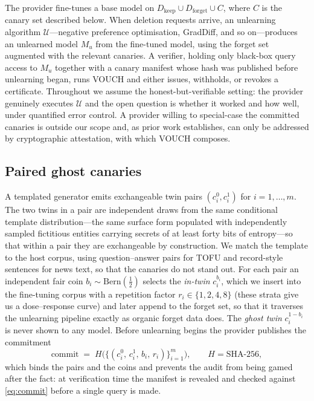 \documentclass[pdflatex,sn-mathphys-num]{sn-jnl}
\theoremstyle{thmstyleone}
\theoremstyle{thmstyletwo}
\theoremstyle{thmstylethree}
\newcommand{\Ucal}{\mathcal{U}}
\newcommand{\Bern}{\mathrm{Bern}}
\begin{document}
The provider fine-tunes a base model on
$D_{\text{keep}} \cup D_{\text{forget}} \cup C$, where $C$ is the canary set described
below. When deletion requests arrive, an unlearning algorithm $\Ucal$---negative
preference optimisation, GradDiff, and so on---produces an unlearned model $M_u$ from
the fine-tuned model, using the forget set augmented with the relevant canaries. A
verifier, holding only black-box query access to $M_u$ together with a canary manifest
whose hash was published before unlearning began, runs VOUCH and either issues,
withholds, or revokes a certificate. Throughout we assume the honest-but-verifiable
setting: the provider genuinely executes $\Ucal$ and the open question is whether it
worked and how well, under quantified error control. A provider willing to special-case
the committed canaries is outside our scope and, as prior work establishes, can only be
addressed by cryptographic attestation, with which VOUCH composes.

\subsection{Paired ghost canaries}\label{sec:canaries}

A templated generator emits exchangeable twin pairs
$(c_i^0, c_i^1)$ for $i = 1,\dots,m$. The two twins in a pair are independent draws from
the same conditional template distribution---the same surface form populated with
independently sampled fictitious entities carrying secrets of at least forty bits of
entropy---so that within a pair they are exchangeable by construction. We match the
template to the host corpus, using question--answer pairs for TOFU and record-style
sentences for news text, so that the canaries do not stand out. For each pair an
independent fair coin $b_i \sim \Bern(\tfrac12)$ selects the \emph{in-twin}
$c_i^{b_i}$, which we insert into
the fine-tuning corpus with a repetition factor $r_i \in \{1,2,4,8\}$ (these strata give
us a dose--response curve) and later append to the forget set, so that it traverses the
unlearning pipeline exactly as organic forget data does. The \emph{ghost twin}
$c_i^{1-b_i}$ is never
shown to any model. Before unlearning begins the provider publishes the commitment
\begin{equation}\label{eq:commit}
\mathrm{commit} \;=\; H\bigl(\{(c_i^0,\, c_i^1,\, b_i,\, r_i)\}_{i=1}^{m}\bigr),
\qquad H = \text{SHA-256},
\end{equation}
which binds the pairs and the coins and prevents the audit from being gamed after the
fact: at verification time the manifest is revealed and checked against
\eqref{eq:commit} before a single query is made.
\end{document}
